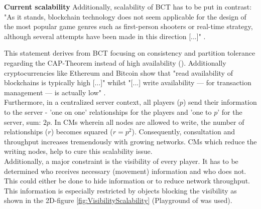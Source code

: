 \noindent \textbf{Current scalability} \textemdash \hspace{0.075cm}Additionally, scalability of BCT has to be put in contrast:
"As it stands, blockchain technology does not seem applicable for the design of the most popular game genres such as first-person shooters or real-time strategy, although several attempts have been made in this direction [...]" \cite[3]{Serada.2020}.
\begin{figure}[!b]
\end{figure}
This statement derives from \gls{BCT} focusing on consistency and partition tolerance regarding the CAP-Theorem instead of high availability (\citet{Angelis.2018}).
Additionally cryptocurrencies like Ethereum and Bitcoin show that "read availability of blockchains is typically high [...]"
whilst "[...] write availability — for transaction management — is actually low" \cite[64]{Weber.2017}. \\
Furthermore, in a centralized server context, all players ($p$) send their information to the
server - 'one on one' relationships for the players and 'one to $p$' for the server, sum: $2p$.
In \gls{CM}s wherein all nodes are allowed to write, the number of relationships ($r$) becomes squared ($r = p^2$).
Consequently, consultation and throughput increases tremendously with growing networks.
\gls{CM}s which reduce the writing nodes, help to cure this scalability issue. \\
Additionally, a major constraint is the visibility of every player.
It has to be determined who receives necessary (movement) information and who does not.
This could either be done to hide information or to reduce network throughput.
This information is especially restricted by objects blocking the visibility as shown in the 2D-figure \ref{fig:VisibilityScalability} (Playground of \citet{RedBlobGames.2020} was used).
